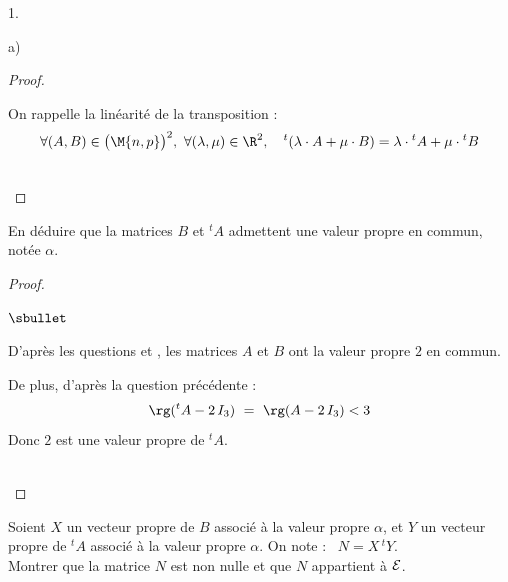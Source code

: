 \begin{noliste}{1.}
\begin{noliste}{a)}
\begin{proof}
      \begin{remark}
        On rappelle la linéarité de la transposition :
        \[
          \forall (A,B) \in \big( \M{n,p} \big)^2, \ \forall (\lambda, 
          \mu) \in \R^2, \quad {}^t(\lambda \cdot A + \mu \cdot B)
          = \lambda \cdot {}^t A + \mu \cdot {}^t B
        \]
      \end{remark}~\\[-1.4cm]
    \end{proof}
    
    
    \newpage

    
    \item En déduire que la matrices $B$ et ${}^t A$ admettent une 
    valeur propre en commun, notée $\alpha$.
    
    \begin{proof}~
      \begin{noliste}{$\sbullet$}
        \item D'après les questions  et , les 
	matrices $A$ et $B$ ont la valeur propre $2$ en commun.
        
        \item De plus, d'après la question précédente : 
        \[
          \rg({}^t A - 2 \, I_3) \ = \ \rg(A- 2 \, I_3) < 3
        \]
        Donc $2$ est une valeur propre de ${}^t A$.
      \end{noliste}
      ~\\[-1cm]
    \end{proof}
    
  \item Soient $X$ un vecteur propre de $B$ associé à la valeur propre
    $\alpha$, et $Y$ un vecteur propre de ${}^t A$ associé à la
    valeur propre $\alpha$. On note : \ $N=X \, {}^t Y$.\\
    Montrer que la matrice $N$ est non nulle et que $N$ appartient à
    ${\cal E}$.
    

\end{noliste}
\end{noliste}
